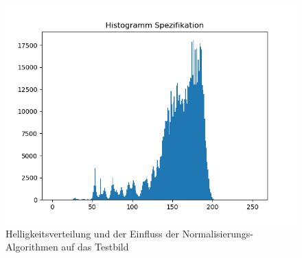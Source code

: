 \begin{appendices}
\begin{figure}[htbp]
\begin{minipage}{0.49\textwidth}
\end{minipage}
\begin{minipage}{0.49\textwidth}
\includegraphics[width=\textwidth]{Sources/Anhang/resize_0250_HS.png}
\end{minipage}
\caption{Helligkeitsverteilung und der Einfluss der Normalisierungs-Algorithmen auf das Testbild}
\label{img:hellver}
\end{figure}


\end{appendices}
